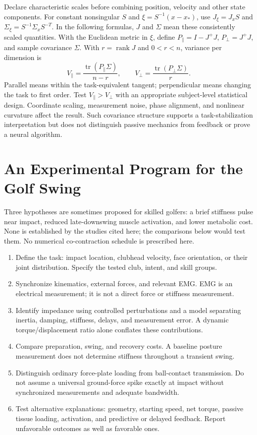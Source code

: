 Declare characteristic scales before combining position, velocity and other
state components. For constant nonsingular $S$ and $\xi=S^{-1}(x-x_*)$, use
$J_\xi=J_xS$ and $\Sigma_\xi=S^{-1}\Sigma_xS^{-T}$. In the following formulas,
$J$ and $\Sigma$ mean these consistently scaled quantities. With the Euclidean
metric in $\xi$, define $P_\parallel=I-J^+J$, $P_\perp=J^+J$, and sample covariance
$\Sigma$. With $r=\operatorname{rank}J$ and $0<r<n$, variance per dimension is
\begin{equation}
V_\parallel=\frac{\operatorname{tr}(P_\parallel\Sigma)}{n-r},\qquad
V_\perp=\frac{\operatorname{tr}(P_\perp\Sigma)}{r}.
\end{equation}
Parallel means within the task-equivalent tangent; perpendicular means changing
the task to first order. Test $V_\parallel>V_\perp$ with an appropriate
subject-level statistical design. Coordinate scaling, measurement noise,
phase alignment, and nonlinear curvature affect the result. Such covariance
structure supports a task-stabilization interpretation but does not distinguish
passive mechanics from feedback or prove a neural algorithm.

\section{An Experimental Program for the Golf Swing}

Three hypotheses are sometimes proposed for skilled golfers: a brief stiffness
pulse near impact, reduced late-downswing muscle activation, and lower metabolic
cost. None is established by the studies cited here; the comparisons below would
test them. No numerical co-contraction schedule is prescribed here.

\begin{enumerate}
\item Define the task: impact location, clubhead velocity, face orientation,
or their joint distribution. Specify the tested club, intent, and skill groups.
\item Synchronize kinematics, external forces, and relevant EMG. EMG is an
electrical measurement; it is not a direct force or stiffness measurement.
\item Identify impedance using controlled perturbations and a model separating
inertia, damping, stiffness, delays, and measurement error. A dynamic
torque/displacement ratio alone conflates these contributions.
\item Compare preparation, swing, and recovery costs. A baseline posture
measurement does not determine stiffness throughout a transient swing.
\item Distinguish ordinary force-plate loading from ball-contact transmission.
Do not assume a universal ground-force spike exactly at impact without
synchronized measurements and adequate bandwidth.
\item Test alternative explanations: geometry, starting speed, net torque,
passive tissue loading, activation, and predictive or delayed feedback.
Report unfavorable outcomes as well as favorable ones.
\end{enumerate}

